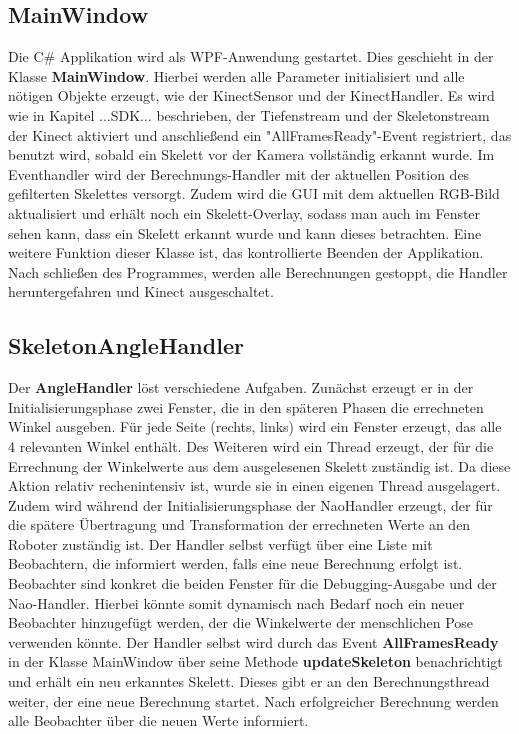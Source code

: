 \subsection{MainWindow}
Die C\# Applikation wird als WPF-Anwendung gestartet. Dies geschieht in der Klasse \textbf{MainWindow}. Hierbei werden alle Parameter initialisiert und alle nötigen Objekte erzeugt, wie der KinectSensor und der KinectHandler. Es wird wie in Kapitel ...SDK... beschrieben, der Tiefenstream und der Skeletonstream der Kinect aktiviert und anschließend ein "AllFramesReady"-Event registriert, das benutzt wird, sobald ein Skelett vor der Kamera vollständig erkannt wurde. Im Eventhandler wird der Berechnungs-Handler mit der aktuellen Position des gefilterten Skelettes versorgt. Zudem wird die GUI mit dem aktuellen RGB-Bild aktualisiert und erhält noch ein Skelett-Overlay, sodass man auch im Fenster sehen kann, dass ein Skelett erkannt wurde und kann dieses betrachten. Eine weitere Funktion dieser Klasse ist, das kontrollierte Beenden der Applikation. Nach schließen des Programmes, werden alle Berechnungen gestoppt, die Handler heruntergefahren und Kinect ausgeschaltet.



\subsection{SkeletonAngleHandler}
Der \textbf{AngleHandler} löst verschiedene Aufgaben. Zunächst erzeugt er in der Initialisierungsphase zwei Fenster, die in den späteren Phasen die errechneten Winkel ausgeben. Für jede Seite (rechts, links) wird ein Fenster erzeugt, das alle 4 relevanten Winkel enthält. Des Weiteren wird ein Thread erzeugt, der für die Errechnung der Winkelwerte aus dem ausgelesenen Skelett zuständig ist. Da diese Aktion relativ rechenintensiv ist, wurde sie in einen eigenen Thread ausgelagert. Zudem wird während der Initialisierungsphase der NaoHandler erzeugt, der für die spätere Übertragung und Transformation der errechneten Werte an den Roboter zuständig ist.
Der Handler selbst verfügt über eine Liste mit Beobachtern, die informiert werden, falls eine neue Berechnung erfolgt ist. Beobachter sind konkret die beiden Fenster für die Debugging-Ausgabe und der Nao-Handler. Hierbei könnte somit dynamisch nach Bedarf noch ein neuer Beobachter hinzugefügt werden, der die Winkelwerte der menschlichen Pose verwenden könnte.
Der Handler selbst wird durch das Event \textbf{AllFramesReady} in der Klasse MainWindow über seine Methode \textbf{updateSkeleton} benachrichtigt und erhält ein neu erkanntes Skelett. Dieses gibt er an den Berechnungsthread weiter, der eine neue Berechnung startet. Nach erfolgreicher Berechnung werden alle Beobachter über die neuen Werte informiert. 

